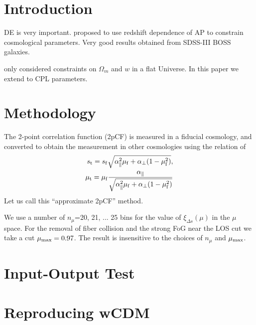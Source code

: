\documentclass[useAMS,usenatbib]{mnras}
\begin{document}

\section{Introduction}


DE is very important. 
\citep{Li2016} proposed to use redshift dependence of AP to constrain cosmological parameters.
Very good results obtained from SDSS-III BOSS galaxies.

\citep{Li2016} only considered constraints on $\Omega_m$ and $w$ in a flat Universe.
In this paper we extend to CPL parameters.




\section{Methodology}

The 2-point correlation function (2pCF) is measured in a fiducial cosmology,
and converted to obtain the measurement in other cosmologies using the relation of 
\begin{eqnarray}
 s_{\rm t} = s_{\rm f} \sqrt{\alpha_{\parallel}^2 \mu_{\rm f}+\alpha_{\bot}(1-\mu_{\rm f}^2)}, \\
 \mu_{\rm t} = \mu_{\rm f} \frac{\alpha_\parallel}
 {\sqrt{\alpha_{\parallel}^2 \mu_{\rm f} +\alpha_{\bot}(1-\mu_{\rm f}^2)}}
\end{eqnarray}
Let us call this ``approximate 2pCF'' method.

We use a number of $n_{\mu}$=20, 21, ... 25 bins for the value of $\xi_{\Delta s}(\mu)$ in the $\mu$ space.
For the removal of fiber collision and the strong FoG near the LOS cut we take a cut $\mu_{\rm max} = 0.97$.
The result is insensitive to the choices of $n_\mu$ and $\mu_{\rm max}$.




\section{Input-Output Test}


\section{Reproducing wCDM}
\end{document}
